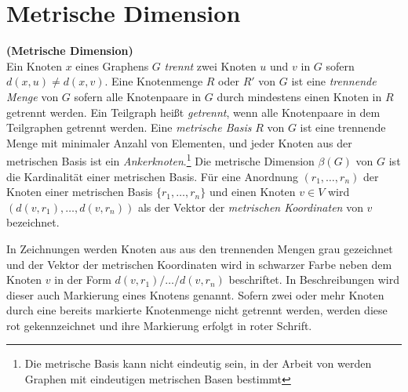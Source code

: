 \section{Metrische Dimension}
\label{MDT}
\begin{defi}{\textbf{(Metrische Dimension)}}\\
Ein Knoten $x$ eines Graphens $G$ \emph{trennt} zwei Knoten $u$ und $v$ in $G$ sofern $d(x, u) \neq d(x, v)$. Eine Knotenmenge $R$ oder $R'$ von $G$ ist eine \emph{trennende Menge} von $G$ sofern alle Knotenpaare in $G$ durch mindestens einen Knoten in $R$ getrennt werden. Ein Teilgraph heißt \emph{getrennt}, wenn alle Knotenpaare in dem Teilgraphen getrennt werden. Eine \emph{metrische Basis} $R$ von $G$ ist eine trennende Menge mit minimaler Anzahl von Elementen, und jeder Knoten aus der metrischen Basis ist ein \emph{Ankerknoten}.\footnote{Die metrische Basis kann nicht eindeutig sein, in der Arbeit von \cite{} werden Graphen mit eindeutigen metrischen Basen bestimmt} \newline %
Die metrische Dimension $\beta(G)$ von $G$ ist die Kardinalität einer metrischen Basis. 
Für eine Anordnung $(r_1,\ldots,r_n)$ der Knoten einer metrischen Basis $\{r_1,\ldots,r_n\}$ und einen Knoten $v \in V$ wird $(d(v, r_1 ), \ldots , d(v, r_n ))$ als der Vektor der \emph{metrischen Koordinaten} von $v$ bezeichnet.
\end{defi}
\begin{bsp}
\end{bsp}
\begin{bem}
In Zeichnungen werden Knoten aus aus den trennenden Mengen grau gezeichnet und der Vektor der metrischen Koordinaten wird in schwarzer Farbe neben dem Knoten $v$ in der Form $d(v, r_1 )/ \ldots / d(v, r_n )$ beschriftet. In Beschreibungen wird dieser auch Markierung eines Knotens genannt. Sofern zwei oder mehr Knoten durch eine bereits markierte Knotenmenge nicht getrennt werden, werden diese rot gekennzeichnet und ihre Markierung erfolgt in roter Schrift. 
\end{bem}
